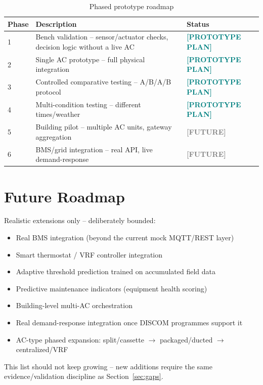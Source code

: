 \documentclass[11pt,a4paper]{article}
\newcommand{\prototype}{\textcolor{teal}{\textbf{[PROTOTYPE PLAN]}}}
\newcommand{\future}{\textcolor{gray}{\textbf{[FUTURE]}}}
\begin{document}
\begin{table}[h!]
\centering
\begin{tabular}{p{1.6cm}p{8cm}p{2.2cm}}
\toprule
\textbf{Phase} & \textbf{Description} & \textbf{Status} \\
\midrule
1 & Bench validation -- sensor/actuator checks, decision logic without a live AC & \prototype \\
2 & Single AC prototype -- full physical integration & \prototype \\
3 & Controlled comparative testing -- A/B/A/B protocol & \prototype \\
4 & Multi-condition testing -- different times/weather & \prototype \\
5 & Building pilot -- multiple AC units, gateway aggregation & \future \\
6 & BMS/grid integration -- real API, live demand-response & \future \\
\bottomrule
\end{tabular}
\caption{Phased prototype roadmap}
\end{table}

\section{Future Roadmap}

Realistic extensions only -- deliberately bounded:
\begin{itemize}[nosep]
    \item Real BMS integration (beyond the current mock MQTT/REST layer)
    \item Smart thermostat / VRF controller integration
    \item Adaptive threshold prediction trained on accumulated field data
    \item Predictive maintenance indicators (equipment health scoring)
    \item Building-level multi-AC orchestration
    \item Real demand-response integration once DISCOM programmes support it
    \item AC-type phased expansion: split/cassette $\to$ packaged/ducted $\to$ centralized/VRF
\end{itemize}

This list should not keep growing -- new additions require the same evidence/validation discipline as Section~\ref{sec:gaps}.

\end{document}
